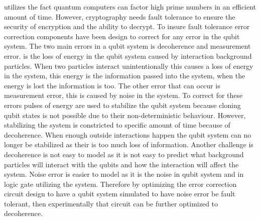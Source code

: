 utilizes the fact quantum computers can factor high prime numbers in an efficient amount of time. However, cryptography needs fault tolerance to ensure the security of encryption and the ability to decrypt.
To insure fault tolerance error correction components have been design to correct for any error in the qubit system. The two main errors in a qubit system is decoherence and measurement error.  is the loss of energy in the qubit system caused by interaction background particles. When two particles interact unintentionally this causes a loss of energy in the system, this energy is the information passed into the system, when the energy is lost the information is
too. The other error that can occur is measurement error, this is caused by noise in the system. To correct for these errors pulses of energy are used to stabilize the qubit system because cloning qubit states is not possible due to their non-deterministic behaviour. However, stabilizing the system is constricted to specific amount of time because of decoherence. When enough outside interactions happen the qubit system can no longer be stabilized as their is too much loss of information.
Another challenge is decoherence is not easy to model as it is not easy to predict what background particles will interact with the qubits and how the interaction will affect the system. Noise error is easier to model as it is the noise in qubit system and in logic gate utilizing the system. Therefore by optimizing the error correction circuit design to have a qubit system simulated to have noise error be fault tolerant, then experimentally that circuit can be further optimized to
decoherence. 


